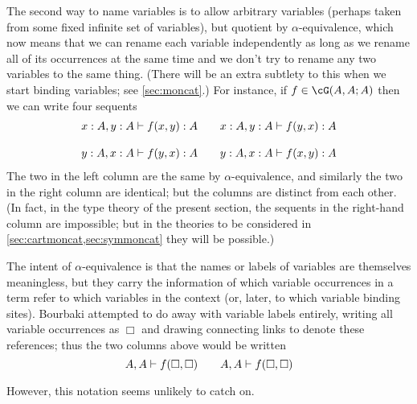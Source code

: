 \documentclass{book}
\let\types\vdash
\begin{document}
The second way to name variables is to allow arbitrary variables (perhaps taken from some fixed infinite set of variables), but quotient by $\alpha$-equivalence, which now means that we can rename each variable independently as long as we rename all of its occurrences at the same time and we don't try to rename any two variables to the same thing.
(There will be an extra subtlety to this when we start binding variables; see \cref{sec:moncat}.)
For instance, if $f\in\cG(A,A;A)$ then we can write four sequents
\[
\begin{array}{c@{\qquad}c}
  x:A, y:A \types f(x,y):A &
  x:A, y:A \types f(y,x):A \\\\
  y:A, x:A \types f(y,x):A &
  y:A, x:A \types f(x,y):A
\end{array}
\]
The two in the left column are the same by $\alpha$-equivalence, and similarly the two in the right column are identical; but the columns are distinct from each other.
(In fact, in the type theory of the present section, the sequents in the right-hand column are impossible; but in the theories to be considered in \cref{sec:cartmoncat,sec:symmoncat} they will be possible.)

\begin{rmk}
The intent of $\alpha$-equivalence is that the names or labels of variables are themselves meaningless, but they carry the information of which variable occurrences in a term refer to which variables in the context (or, later, to which variable binding sites).
Bourbaki attempted to do away with variable labels entirely, writing all variable occurrences as $\Box$ and drawing connecting links to denote these references; thus the two columns above would be written
\[
\tikz[remember picture] \node[rectangle, inner sep=0pt] (a1) {$A$};,
\tikz[remember picture] \node[rectangle, inner sep=0pt] (a2) {$A$}; \types
f(\tikz[remember picture] \node[rectangle, inner sep=0pt] (b1) {$\Box$};,
\tikz[remember picture] \node[rectangle, inner sep=0pt] (b2) {$\Box$};)
\qquad
\tikz[remember picture] \node[rectangle, inner sep=0pt] (a1p) {$A$};,
\tikz[remember picture] \node[rectangle, inner sep=0pt] (a2p) {$A$}; \types
f(\tikz[remember picture] \node[rectangle, inner sep=0pt] (b2p) {$\Box$};,
\tikz[remember picture] \node[rectangle, inner sep=0pt] (b1p) {$\Box$};)
\]

\noindent
However, this notation seems unlikely to catch on.
\end{rmk}
\end{document}
